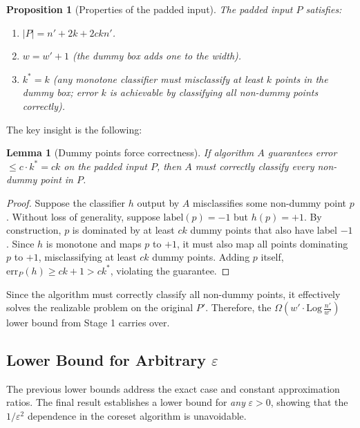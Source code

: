 \documentclass[11pt, a4paper]{article}
\theoremstyle{boxed}
\newtheorem{innerlemma}{Lemma}[section]
\newtheorem{innerproposition}{Proposition}[section]
\newenvironment{lemma}
  {\begin{mdframed}[style=lemstyle]\begin{innerlemma}}
  {\end{innerlemma}\end{mdframed}}
\newenvironment{proposition}
  {\begin{mdframed}[style=propstyle]\begin{innerproposition}}
  {\end{innerproposition}\end{mdframed}}
\newcommand{\kstar}{k^{*}}
\begin{document}
\begin{proposition}[Properties of the padded input]
  The padded input $P$ satisfies:
  \begin{enumerate}
    \item $|P| = n' + 2k + 2ckn'$.
    \item $w = w' + 1$ (the dummy box adds one to the width).
    \item $\kstar = k$ (any monotone classifier must misclassify at least $k$ points in the dummy box; error $k$ is achievable by classifying all non-dummy points correctly).
  \end{enumerate}
\end{proposition}

The key insight is the following:

\begin{lemma}[Dummy points force correctness]
  If algorithm $A$ guarantees error $\le c \cdot \kstar = ck$ on the padded input $P$, then $A$ must correctly classify \emph{every non-dummy point} in $P$.
\end{lemma}

\begin{proof}
  Suppose the classifier $h$ output by $A$ misclassifies some non-dummy point $p$. Without loss of generality, suppose $\mathrm{label}(p) = -1$ but $h(p) = +1$. By construction, $p$ is dominated by at least $ck$ dummy points that also have label $-1$. Since $h$ is monotone and maps $p$ to $+1$, it must also map all points dominating $p$ to $+1$, misclassifying at least $ck$ dummy points. Adding $p$ itself, $\mathrm{err}_P(h) \ge ck + 1 > c\kstar$, violating the guarantee.
\end{proof}

Since the algorithm must correctly classify all non-dummy points, it effectively solves the realizable problem on the original $P'$. Therefore, the $\Omega(w' \cdot \mathrm{Log}\,\frac{n'}{w'})$ lower bound from Stage 1 carries over.


\subsection{Lower Bound for Arbitrary $\varepsilon$}\label{sec:lb-arbitrary}

The previous lower bounds address the exact case and constant approximation ratios. The final result establishes a lower bound for \emph{any} $\varepsilon > 0$, showing that the $1/\varepsilon^2$ dependence in the coreset algorithm is unavoidable.
\end{document}
